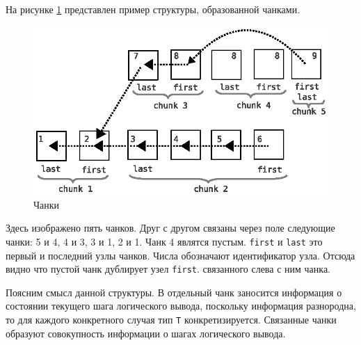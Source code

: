 На рисунке \ref{fig:chank1} представлен пример структуры, образованной чанками.
\begin{figure}[h]
	\centering
	\includegraphics[width=0.6\linewidth]{pics/ChunkFull.eps}
	\caption{Чанки}
	\label{fig:chank1}
\end{figure}
Здесь изображено пять чанков. Друг с другом связаны через поле \texttt{} следующие чанки: 5 и 4, 4 и 3, 3 и 1, 2 и 1. Чанк 4 являтся пустым. \texttt{first}  и \texttt{last} это первый и последний узлы чанков. Числа обозначают идентификатор узла. Отсюда видно что пустой чанк дублирует узел \texttt{first}. связанного слева с ним чанка.

Поясним смысл данной структуры. В отдельный чанк заносится информация о состоянии текущего шага логического вывода, поскольку информация разнородна, то для каждого конкретного случая тип {\tt T} конкретизируется. Связанные чанки образуют совокупность информации о шагах логического вывода.




